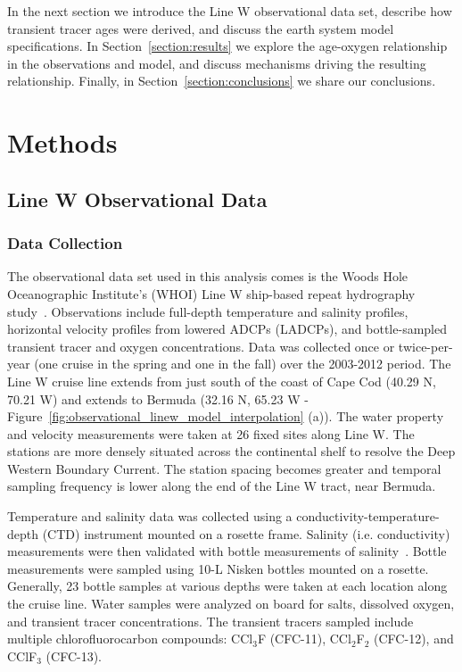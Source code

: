 In the next section we introduce the Line W observational data set, describe how
transient tracer ages were derived, and discuss the earth system model specifications.
In Section~\ref{section:results} we explore the age-oxygen relationship in the observations and model,
and discuss mechanisms driving the resulting relationship. Finally, in Section~\ref{section:conclusions}
we share our conclusions.



\section{Methods}
\label{section:methods}
\subsection{Line W Observational Data}
\subsubsection{Data Collection}
The observational data set used in this analysis comes is the Woods Hole Oceanographic
Institute's (WHOI) Line W ship-based repeat hydrography study~\citep{Andres2017}.
Observations include full-depth temperature and salinity profiles, horizontal
velocity profiles from lowered ADCPs (LADCPs), and bottle-sampled transient tracer
and oxygen concentrations.  Data was collected once or twice-per-year (one cruise
in the spring and one in the fall) over the 2003-2012 period. The Line W cruise
line extends from just south of the coast of Cape Cod (40.29 N, 70.21 W) and
extends to Bermuda (32.16 N, 65.23 W - Figure~\ref{fig:observational_linew_model_interpolation}
(a)). The water property and velocity measurements were taken at 26 fixed sites
along Line W. The stations are more densely situated across the continental shelf
to resolve the Deep Western Boundary Current. The station spacing becomes greater
and temporal sampling frequency is lower along the end of the Line W tract, near Bermuda.

Temperature and salinity data was collected using a conductivity-temperature-depth
(CTD) instrument mounted on a rosette frame. Salinity (i.e. conductivity)
measurements were then validated with bottle measurements of salinity~\citep{Millard1930}.
Bottle measurements were sampled using 10-L Nisken bottles
mounted on a rosette. Generally, 23 bottle samples at various depths were taken
at each location along the cruise line. Water samples were analyzed on board for
salts, dissolved oxygen, and transient tracer concentrations. The transient tracers
sampled include multiple chlorofluorocarbon compounds: CCl$_3$F (CFC-11), CCl$_2$F$_2$ (CFC-12),
and CClF$_3$ (CFC-13).

